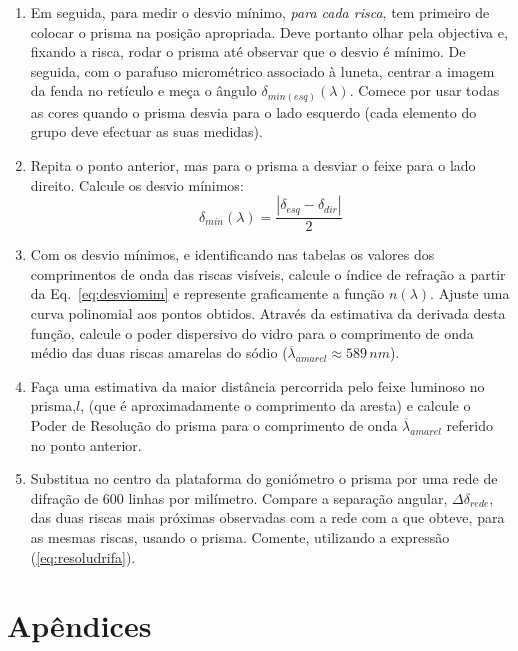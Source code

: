 \documentclass[a4paper,12pt]{article}  %
\begin{document}
\begin{enumerate}
\item  Em seguida, para medir o desvio mínimo,  \emph{para cada risca}, tem primeiro de colocar o prisma na posição apropriada. Deve portanto olhar pela objectiva e, fixando a risca,  rodar o prisma até observar que o desvio é mínimo.
De seguida,  com  o  parafuso micrométrico associado à luneta, centrar  a imagem  da fenda no retículo e meça o  ângulo  $\delta_{min(esq)}(\lambda)$. Comece por usar todas as cores quando o prisma desvia para o lado esquerdo (cada elemento do grupo deve efectuar as suas medidas). 
\item Repita o ponto anterior, mas para o prisma a desviar o feixe para o lado direito. Calcule os desvio mínimos:
$$\delta_{min}(\lambda) = \frac{|\delta_{esq} -  \delta_{dir}|}{2}$$ 
\item Com os desvio mínimos, e identificando  nas tabelas os valores  dos  comprimentos  de onda das riscas visíveis, calcule o
índice de refração a partir da Eq.~\ref{eq:desviomim} e represente  graficamente a função $n(\lambda)$. Ajuste uma curva polinomial aos pontos obtidos. Através da  estimativa da derivada desta função, calcule o poder dispersivo do vidro para o comprimento de onda médio das 
duas riscas amarelas do sódio ($\overline{\lambda}_{amarel}\approx 589\,nm$). 
\item Faça uma estimativa da maior distância percorrida pelo feixe luminoso no prisma,$l$, (que é aproximadamente o comprimento da aresta) e calcule 
  o  Poder  de  Resolução  do  prisma  para  o comprimento de onda $\overline{\lambda}_{amarel}$ referido  no  ponto  anterior. 
\item Substitua no centro da plataforma do goniómetro o prisma por uma rede de difração de 
600 linhas por milímetro. Compare a separação angular, $\Delta \delta_{rede}$, das duas riscas mais próximas 
observadas  com  a  rede  com  a  que  obteve,  para  as  mesmas  riscas,  usando  o  prisma. 
Comente, utilizando a expressão (\ref{eq:resoludrifa}). 

\end{enumerate}

\section*{\sf Apêndices}
\end{document}
